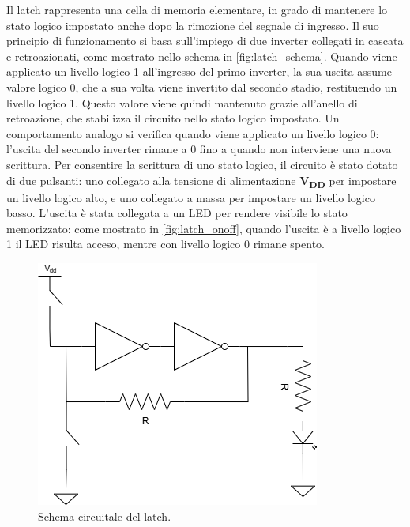 \documentclass[a4paper,12pt]{article}
\begin{document}
Il latch rappresenta una cella di memoria elementare, in grado di mantenere lo stato logico impostato anche dopo la rimozione del segnale di ingresso.  
Il suo principio di funzionamento si basa sull’impiego di due inverter collegati in cascata e retroazionati, come mostrato nello schema in \autoref{fig:latch_schema}.  
Quando viene applicato un livello logico 1 all’ingresso del primo inverter, la sua uscita assume valore logico 0, che a sua volta viene invertito dal secondo stadio, restituendo un livello logico 1.  
Questo valore viene quindi mantenuto grazie all’anello di retroazione, che stabilizza il circuito nello stato logico impostato.  
Un comportamento analogo si verifica quando viene applicato un livello logico 0: l’uscita del secondo inverter rimane a 0 fino a quando non interviene una nuova scrittura.
Per consentire la scrittura di uno stato logico, il circuito è stato dotato di due pulsanti: 
uno collegato alla tensione di alimentazione \textbf{V\textsubscript{DD}} per impostare un livello logico alto, e uno collegato a massa per impostare un livello logico basso. 
L’uscita è stata collegata a un LED per rendere visibile lo stato memorizzato: come mostrato in \autoref{fig:latch_onoff}, quando l’uscita è a livello logico 1 il LED risulta acceso, mentre con livello logico 0 rimane spento.
\begin{figure}[H]
    \centering
    \includegraphics[width=0.6\linewidth]{immagini/latch/Latch.png}
    \caption{Schema circuitale del latch.}
    \label{fig:latch_schema}
\end{figure}
\end{document}
